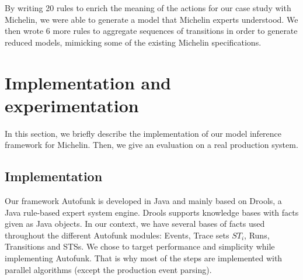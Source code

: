 By writing 20 rules to enrich the meaning of the actions for our
case study with Michelin, we were able to generate a model that
Michelin experts understood. We then wrote 6 more rules to
aggregate sequences of transitions in order to generate reduced
models, mimicking some of the existing Michelin specifications.


\section{Implementation and experimentation}
\label{sec:modelinf:prodsystems:results}

In this section, we briefly describe the implementation of our
model inference framework for Michelin. Then, we give an
evaluation on a real production system.

\subsection{Implementation}
\label{sec:impl-exp-collect}

Our framework Autofunk is developed in Java and mainly based on
Drools, a Java rule-based expert system engine. Drools supports
knowledge bases with facts given as Java objects. In our context,
we have several bases of facts used throughout the different
Autofunk modules: Events, Trace sets $ST_i$, Runs, Transitions
and STSs.  We chose to target performance and simplicity while
implementing Autofunk. That is why most of the steps are
implemented with parallel algorithms (except the production event
parsing).


